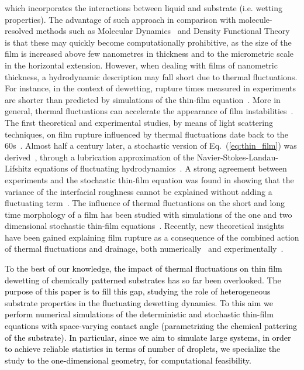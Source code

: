 which incorporates the interactions between liquid and substrate (i.e. wetting properties).
The advantage of such approach in comparison with molecule-resolved methods such as Molecular Dynamics~\cite{haile1992molecular, PhysRevE.100.023108, doi:10.1063/1.1290698, grabow1988thin}
and Density Functional Theory~\cite{PhysRevA.40.2567, tarazona1984simple, meister1985density, hughes2014introduction} is that these 
may quickly become computationally prohibitive, as the size of the film is increased above few nanometres in thickness and to the micrometric scale in the horizontal extension.
However, when dealing with films of nanometric thickness, a hydrodynamic description may fall short due to thermal fluctuations. 
For instance, in the context of dewetting, rupture times measured in experiments are shorter than predicted by simulations of the thin-film equation~\cite{herminghaus1996dewetting,herminghaus1998dewetting,becker2003complex}.
More in general, thermal fluctuations can accelerate the appearance of film instabilities~\cite{Rauscher2008,tsekov1993effect, PhysRevLett.99.114503, PhysRevE.100.023108}.
The first theoretical and experimental studies, by means of light scattering techniques, on film rupture influenced by thermal fluctuations date back to the 60s~\cite{doi:10.1021/ja01014a015}.
Almost half a century later, a stochastic version of Eq.~(\ref{eq:thin_film}) was derived~\cite{Grun2006, Mecke_2005, PhysRevLett.95.244505}, through a lubrication approximation of the Navier-Stokes-Landau-Lifshitz 
equations of fluctuating hydrodynamics~\cite{Landau1987Fluid}.
A strong agreement between experiments and the stochastic thin-film equation was found in showing that the variance of the interfacial roughness cannot be explained without adding a fluctuating term~\cite{PhysRevLett.99.114503}.
The influence of thermal fluctuations on the short and long time morphology of a film has been studied with simulations of the one and two dimensional stochastic thin-film equations~\cite{PhysRevE.92.061002, alizadeh_pahlavan_cueto-felgueroso_hosoi_mckinley_juanes_2018}. 
Recently, new theoretical insights have been gained explaining film rupture as a consequence of the combined action of thermal fluctuations and drainage, both numerically~\cite{shah_van_steijn_kleijn_kreutzer_2019} and experimentally~\cite{PhysRevLett.125.158001}.

\textcolor{black}{To the best of our knowledge, the impact of thermal fluctuations on thin film dewetting
of chemically patterned substrates has so far been overlooked.
The purpose of this paper is to fill this gap, studying the role of heterogeneous substrate properties in the fluctuating dewetting dynamics.
To this aim we perform numerical simulations of the deterministic and stochastic thin-film equations with space-varying contact angle 
(parametrizing the chemical pattering of the substrate). In particular, since we aim to simulate large systems, in order to achieve reliable 
statistics in terms of number of droplets, we specialize the study to the one-dimensional geometry, for computational feasibility.}

